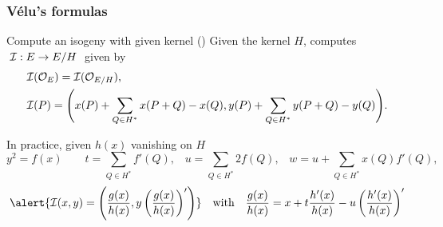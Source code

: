 \documentclass[10pt,usepdftitle=false]{beamer}
\begin{document}
\begin{frame}
  \frametitle{Vélu's formulas}
  
  \begin{block}{Compute an isogeny with given kernel (\cite{velu71})}
    Given the kernel $H$, computes $\;\mathcal{I} : E\to E/H\;$ given by
    \begin{align*}
      &\mathcal{I}(\mathcal{O}_E) = \mathcal{I}(\mathcal{O}_{E/H})\text{,}\\
      &\begin{aligned}
        \mathcal{I}(P) = \Biggl(x(P) + \sum_{Q\in H^\ast}x(P+Q) - x(Q),
        y(P) + \sum_{Q\in H^\ast}y(P+Q) - y(Q) \Biggr) \text{.}
      \end{aligned}
    \end{align*}
  \end{block}

  \begin{block}{In practice, given $h(x)$ vanishing on $H$}
    {\footnotesize
      \[
      y^2 = f(x)
      \qquad
      t = \sum_{Q\in H^\ast} f'(Q)\text{,}
      \quad
      u = \sum_{Q\in H^\ast} 2f(Q)\text{,}
      \quad
      w = u + \sum_{Q\in H^\ast} x(Q)f'(Q)\text{,}\]}
    \[\alert{\I(x,y) = \left(\frac{g(x)}{h(x)}, y\left(\frac{g(x)}{h(x)}\right)'\right)}
    \quad\text{with}\quad
    \frac{g(x)}{h(x)} = x + t\frac{h'(x)}{h(x)} - u\left(\frac{h'(x)}{h(x)}\right)'\]
  \end{block}
\end{frame}

\end{document}
